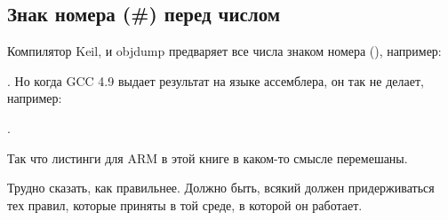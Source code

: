 ﻿

\subsection{Знак номера (\#) перед числом}

Компилятор Keil, \IDA и objdump предваряет все числа знаком номера (\q{\#}), например:

.
Но когда GCC 4.9 выдает результат на языке ассемблера, он так не делает, например:

.

Так что листинги для ARM в этой книге в каком-то смысле перемешаны.

Трудно сказать, как правильнее.
Должно быть, всякий должен придерживаться тех правил, которые приняты в той среде, в которой он работает.




